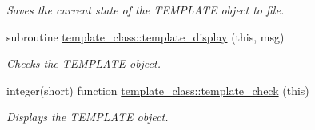 \begin{DoxyCompactItemize}
\begin{DoxyCompactList}\small\item\em Saves the current state of the T\+E\+M\+P\+L\+A\+TE object to file. \end{DoxyCompactList}\item 
subroutine \hyperlink{namespacetemplate__class_abce4d2dbf856d00e563f5bb628c446cd}{template\+\_\+class\+::template\+\_\+display} (this, msg)
\begin{DoxyCompactList}\small\item\em Checks the T\+E\+M\+P\+L\+A\+TE object. \end{DoxyCompactList}\item 
integer(short) function \hyperlink{namespacetemplate__class_a61fa7b21db4be16f8d32b67df5b9463c}{template\+\_\+class\+::template\+\_\+check} (this)
\begin{DoxyCompactList}\small\item\em Displays the T\+E\+M\+P\+L\+A\+TE object. \end{DoxyCompactList}\end{DoxyCompactItemize}
